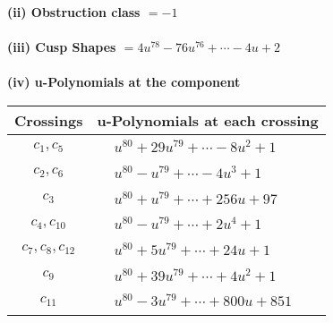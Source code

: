 \documentclass[1p]{elsarticle_modified}
\theoremstyle{definition}
\begin{document}
\flushleft \textbf{(ii) Obstruction class $= -1$}\\~\\
\flushleft \textbf{(iii) Cusp Shapes $= 4 u^{78}-76 u^{76}+\cdots-4 u+2$}\\~\\
\newpage\renewcommand{\arraystretch}{1}
\flushleft \textbf{(iv) u-Polynomials at the component}\newline \\
\begin{tabular}{m{50pt}|m{274pt}}
Crossings & \hspace{64pt}u-Polynomials at each crossing \\
\hline $$\begin{aligned}c_{1},c_{5}\end{aligned}$$&$\begin{aligned}
&u^{80}+29 u^{79}+\cdots-8 u^2+1
\end{aligned}$\\
\hline $$\begin{aligned}c_{2},c_{6}\end{aligned}$$&$\begin{aligned}
&u^{80}- u^{79}+\cdots-4 u^3+1
\end{aligned}$\\
\hline $$\begin{aligned}c_{3}\end{aligned}$$&$\begin{aligned}
&u^{80}+u^{79}+\cdots+256 u+97
\end{aligned}$\\
\hline $$\begin{aligned}c_{4},c_{10}\end{aligned}$$&$\begin{aligned}
&u^{80}- u^{79}+\cdots+2 u^4+1
\end{aligned}$\\
\hline $$\begin{aligned}c_{7},c_{8},c_{12}\end{aligned}$$&$\begin{aligned}
&u^{80}+5 u^{79}+\cdots+24 u+1
\end{aligned}$\\
\hline $$\begin{aligned}c_{9}\end{aligned}$$&$\begin{aligned}
&u^{80}+39 u^{79}+\cdots+4 u^2+1
\end{aligned}$\\
\hline $$\begin{aligned}c_{11}\end{aligned}$$&$\begin{aligned}
&u^{80}-3 u^{79}+\cdots+800 u+851
\end{aligned}$\\
\hline
\end{tabular}\\~\\
\end{document}
